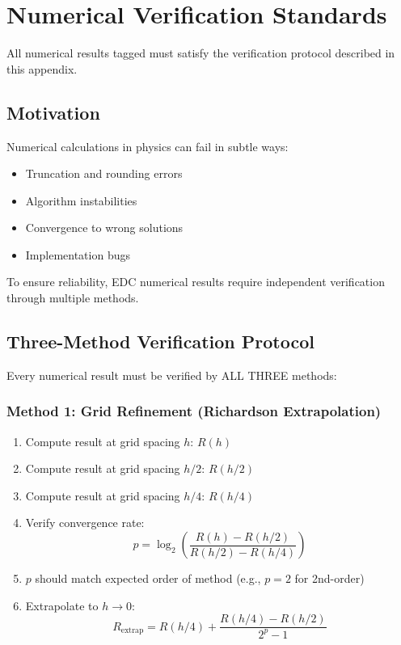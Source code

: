\chapter{Numerical Verification Standards}
\label{app:numerical_standards}

All numerical results tagged \tagDerNum{} must satisfy the verification
protocol described in this appendix.

\section{Motivation}

Numerical calculations in physics can fail in subtle ways:
\begin{itemize}[nosep]
\item Truncation and rounding errors
\item Algorithm instabilities
\item Convergence to wrong solutions
\item Implementation bugs
\end{itemize}

To ensure reliability, EDC numerical results require independent verification
through multiple methods.

\section{Three-Method Verification Protocol}

Every numerical result must be verified by ALL THREE methods:

\subsection{Method 1: Grid Refinement (Richardson Extrapolation)}

\begin{enumerate}
\item Compute result at grid spacing $h$: $R(h)$
\item Compute result at grid spacing $h/2$: $R(h/2)$
\item Compute result at grid spacing $h/4$: $R(h/4)$
\item Verify convergence rate:
\begin{equation}
p = \log_2\left(\frac{R(h) - R(h/2)}{R(h/2) - R(h/4)}\right)
\end{equation}
\item $p$ should match expected order of method (e.g., $p = 2$ for 2nd-order)
\item Extrapolate to $h \to 0$:
\begin{equation}
R_{\text{extrap}} = R(h/4) + \frac{R(h/4) - R(h/2)}{2^p - 1}
\end{equation}
\end{enumerate}

